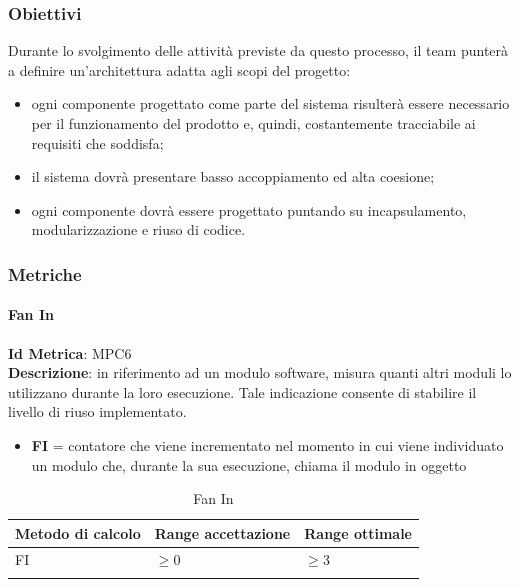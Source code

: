 		\subsubsection{Obiettivi}
		Durante lo svolgimento delle attività previste da questo processo, il team punterà a definire
		un’architettura adatta agli scopi del progetto:
		\begin{itemize}
			\item ogni componente progettato come parte del sistema risulterà essere necessario per il funzionamento del prodotto e, quindi, costantemente tracciabile ai requisiti che soddisfa;
			\item il sistema dovrà presentare basso accoppiamento ed alta coesione;
			\item ogni componente dovrà essere progettato puntando su incapsulamento, modularizzazione
			e riuso di codice.
		\end{itemize}
		
		\subsubsection{Metriche}
			\paragraph{Fan In}
			\textbf{Id Metrica}: \hypertarget{MPC6}{MPC6}\\
			\textbf{Descrizione}: in riferimento ad un modulo software, misura quanti altri moduli lo utilizzano durante la loro esecuzione.
			Tale indicazione consente di stabilire il livello di riuso implementato.
			
			\begin{itemize}
				\item \textbf{FI} = contatore che viene incrementato nel momento in cui viene individuato un modulo che, durante la sua esecuzione, chiama il modulo in oggetto
			\end{itemize}
			
			\begin{longtable}{>{\centering\arraybackslash}p{5cm}|>{\centering\arraybackslash}p{5cm} | >{\centering\arraybackslash}p{5cm}}
					\hline
					\rowcolor{Gray}
					\textbf{Metodo di calcolo} & \textbf{Range accettazione} & \textbf{Range ottimale} \\
					\hline
					FI & \begin{math}\geq{0} \end{math}   & \begin{math}\geq{3} \end{math} 
				\\
				\caption{Fan In}
			\end{longtable}
			
